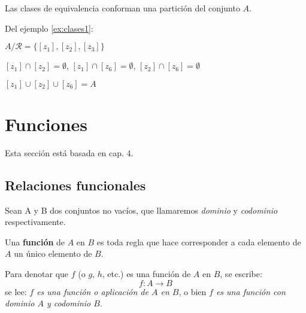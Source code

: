 Las clases de equivalencia conforman una partición del conjunto $A$.

\begin{fmd-example}[Particiones]
	Del ejemplo \ref{ex:clases1}:
	
	\begin{minipage}{.45\textwidth}
		\begin{figure}[H]
			\centering
			
		\end{figure}
	\end{minipage}
	\begin{minipage}{.45\textwidth}
		\centering
		$A/\mathcal{R} = \{ [z_1], [z_2], [z_3] \}$
		\vspace{2mm}
		
		$[z_1] \cap [z_2] = \emptyset$, $[z_1] \cap [z_6] = \emptyset$, $[z_2] \cap [z_6] = \emptyset$
		\vspace{2mm}
		
		$[z_1] \cup [z_2] \cup [z_6] = A$
	\end{minipage}
\end{fmd-example}

\section{Funciones}
Esta sección está basada en \cite{rojoAlgebra8vaEd} cap. 4.
\subsection{Relaciones funcionales} \label{sec:relaciones}

Sean A y B dos conjuntos no vacíos, que llamaremos \textit{dominio} y \textit{codominio} respectivamente. \par

Una \textbf{función} de $A$ en $B$ es toda regla que hace corresponder a cada elemento
de $A$ un único elemento de $B$.

Para denotar que $f$ (o $g$, $h$, etc.) es una función de $A$ en $B$, se escribe:
\[f: A \rightarrow B\]
se lee: \emph{$f$ es una función o aplicación de $A$ en $B$}, o bien \emph{$f$ es una función con dominio $A$ y codominio $B$}.

